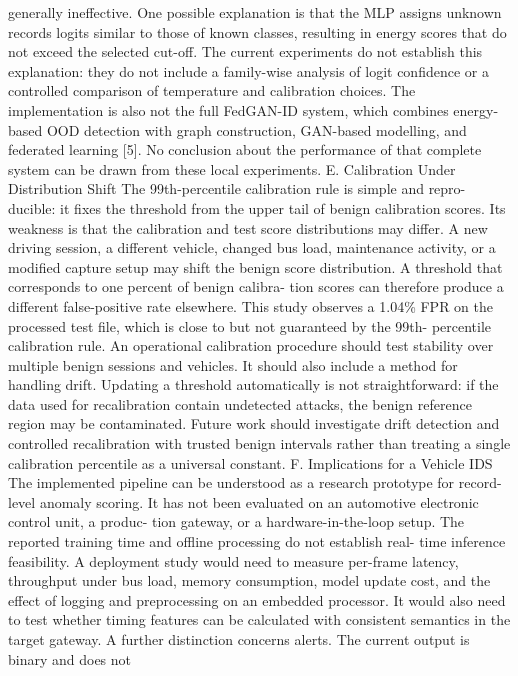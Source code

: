 \documentclass[
]{article}
\begin{document}
generally ineffective. One possible explanation is that the MLP assigns
unknown records logits similar to those of known classes, resulting in
energy scores that do not exceed the selected cut-off. The current
experiments do not establish this explanation: they do not include a
family-wise analysis of logit confidence or a controlled comparison of
temperature and calibration choices. The implementation is also not the
full FedGAN-ID system, which combines energy-based OOD detection with
graph construction, GAN-based modelling, and federated learning {[}5{]}.
No conclusion about the performance of that complete system can be drawn
from these local experiments. E. Calibration Under Distribution Shift
The 99th-percentile calibration rule is simple and repro- ducible: it
fixes the threshold from the upper tail of benign calibration scores.
Its weakness is that the calibration and test score distributions may
differ. A new driving session, a different vehicle, changed bus load,
maintenance activity, or a modified capture setup may shift the benign
score distribution. A threshold that corresponds to one percent of
benign calibra- tion scores can therefore produce a different
false-positive rate elsewhere. This study observes a 1.04\% FPR on the
processed test file, which is close to but not guaranteed by the 99th-
percentile calibration rule. An operational calibration procedure should
test stability over multiple benign sessions and vehicles. It should
also include a method for handling drift. Updating a threshold
automatically is not straightforward: if the data used for recalibration
contain undetected attacks, the benign reference region may be
contaminated. Future work should investigate drift detection and
controlled recalibration with trusted benign intervals rather than
treating a single calibration percentile as a universal constant. F.
Implications for a Vehicle IDS The implemented pipeline can be
understood as a research prototype for record-level anomaly scoring. It
has not been evaluated on an automotive electronic control unit, a
produc- tion gateway, or a hardware-in-the-loop setup. The reported
training time and offline processing do not establish real- time
inference feasibility. A deployment study would need to measure
per-frame latency, throughput under bus load, memory consumption, model
update cost, and the effect of logging and preprocessing on an embedded
processor. It would also need to test whether timing features can be
calculated with consistent semantics in the target gateway. A further
distinction concerns alerts. The current output is binary and does not
\end{document}
